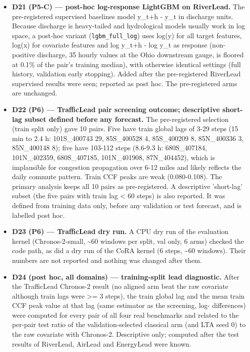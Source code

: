 \begin{itemize}
\item \textbf{D21 (P5-C) — post-hoc log-response LightGBM on RiverLead.} The pre-registered supervised baselines model y\_{t+h} - y\_t in discharge units. Because discharge is heavy-tailed and hydrological models usually work in log space, a post-hoc variant (\texttt{lgbm\_full\_log}) uses log(y) for all target features, log(x) for covariate features and log y\_{t+h} - log y\_t as response (non-positive discharge, 35 hourly values at the Ohio downstream gauge, is floored at 0.1\% of the pair's training median), with otherwise identical settings (full history, validation early stopping). Added after the pre-registered RiverLead supervised results were seen; reported as post hoc. The pre-registered arms are unchanged.
\item \textbf{D22 (P6) — TrafficLead pair screening outcome; descriptive short-lag subset defined before any forecast.} The pre-registered selection (train split only) gave 10 pairs. Five have train global lags of 3-29 steps (15 min to 2.4 h: 101S\_400743 29, 85S\_400528 4, 85S\_400209 8, 85N\_400336 3, 85N\_400148 8); five have 103-112 steps (8.6-9.3 h: 680S\_407184, 101N\_402359, 680S\_407185, 101N\_401908, 87N\_404452), which is implausible for congestion propagation over 6-12 miles and likely reflects the daily commute pattern. Train CCF peaks are weak (0.080-0.108). The primary analysis keeps all 10 pairs as pre-registered. A descriptive 'short-lag' subset (the five pairs with train lag < 60 steps) is also reported. It was defined from training data only, before any validation or test forecast, and is labelled post hoc.
\item \textbf{D23 (P6) — TrafficLead dry run.} A CPU dry run of the evaluation kernel (Chronos-2-small, \textasciitilde{}60 windows per split, val only, 6 arms) checked the code path, as did a dry run of the CoRA kernel (6 steps, \textasciitilde{}60 windows). Their numbers are not reported and nothing was changed after them.
\item \textbf{D24 (post hoc, all domains) — training-split lead diagnostic.} After the TrafficLead Chronos-2 result (no aligned arm beat the raw covariate although train lags were >= 3 steps), the train global lag and the mean train CCF peak value at that lag (same estimator as the screening, log- differences) were computed for every pair of all four real benchmarks and related to the per-pair test ratio of the validation-selected classical arm (and LTA seed 0) to the raw covariate with Chronos-2. Descriptive only; computed after the test results of RiverLead, AirLead and EnergyLead were known.

\end{itemize}
